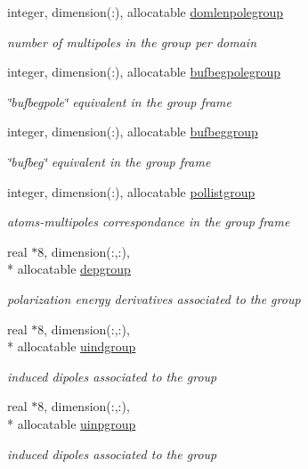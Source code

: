 \begin{DoxyCompactItemize}
integer, dimension(\-:), allocatable \hyperlink{classgroup_abccd8ee5026fe4c409268a0384ee21bc}{domlenpolegroup}
\begin{DoxyCompactList}\small\item\em number of multipoles in the group per domain \end{DoxyCompactList}\item 
integer, dimension(\-:), allocatable \hyperlink{classgroup_a905b6f20bc398a08c920b2370f07b2db}{bufbegpolegroup}
\begin{DoxyCompactList}\small\item\em \char`\"{}bufbegpole\char`\"{} equivalent in the group frame \end{DoxyCompactList}\item 
integer, dimension(\-:), allocatable \hyperlink{classgroup_a2f0f2630e993dcd27f4c35fdd35f6450}{bufbeggroup}
\begin{DoxyCompactList}\small\item\em \char`\"{}bufbeg\char`\"{} equivalent in the group frame \end{DoxyCompactList}\item 
integer, dimension(\-:), allocatable \hyperlink{classgroup_ae76b1bdc2fb015b4edcc24ef18f871cf}{pollistgroup}
\begin{DoxyCompactList}\small\item\em atoms-\/multipoles correspondance in the group frame \end{DoxyCompactList}\item 
real $\ast$8, dimension(\-:,\-:), \\*
allocatable \hyperlink{classgroup_a72ba92e2b0de980278647c3fa93e6f89}{depgroup}
\begin{DoxyCompactList}\small\item\em polarization energy derivatives associated to the group \end{DoxyCompactList}\item 
real $\ast$8, dimension(\-:,\-:), \\*
allocatable \hyperlink{classgroup_a2ac2d2816e7a0da15f14f3864b494a2b}{uindgroup}
\begin{DoxyCompactList}\small\item\em induced dipoles associated to the group \end{DoxyCompactList}\item 
real $\ast$8, dimension(\-:,\-:), \\*
allocatable \hyperlink{classgroup_aa02596bd4aa59b3de78c044c37663b7d}{uinpgroup}
\begin{DoxyCompactList}\small\item\em induced dipoles associated to the group \end{DoxyCompactList}\item 

\end{DoxyCompactItemize}
